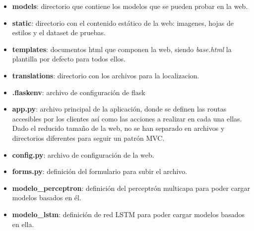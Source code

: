 \begin{itemize}
    \item \textbf{models}: directorio que contiene los modelos que se pueden probar en la web.
    \item \textbf{static}: directorio con el contenido estático de la web: imagenes, hojas de estilos y el dataset de pruebas.
    \item \textbf{templates}: documentos html que componen la web, siendo \textit{base.html} la plantilla por defecto para todos ellos.
    \item \textbf{translations}: directorio con los archivos para la localizacion.
	\item \textbf{.flaskenv}: archivo de configuración de flask
	\item \textbf{app.py}: archivo principal de la aplicación, donde se definen las routas accesibles por los clientes así como las acciones a realizar en cada una ellas. Dado el reducido tamaño de la web, no se han separado en archivos y directorios diferentes para seguir un patrón MVC.
	\item \textbf{config.py}: archivo de configuración de la web.
	\item \textbf{forms.py}: definición del formulario para subir el archivo.
	\item \textbf{modelo\_perceptron}: definición del perceptrón multicapa para poder cargar modelos basados en él.
    \item \textbf{modelo\_lstm}: definición de red LSTM para poder cargar modelos basados en ella.
\end{itemize}

